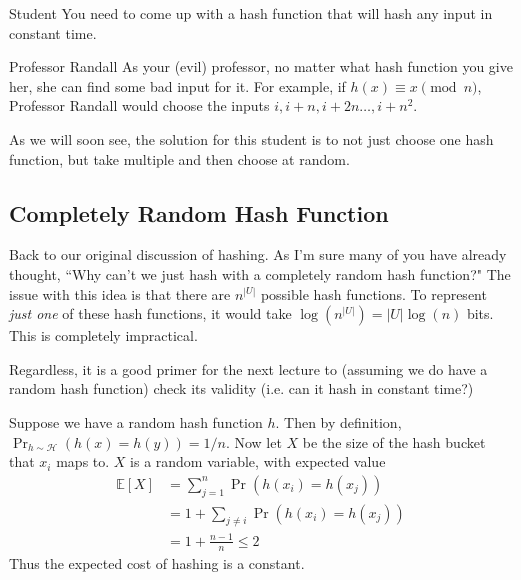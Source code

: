 \documentclass[14pt]{extreport}
\begin{document}
    \begin{tcolorbox}[enhanced,interior style={top color=Plum!10,bottom color=Plum!20}]
        \begin{mybox}[
            colframe=Cerulean!50!black,
            colback=Cerulean!30,
            colbacktitle=Cerulean!,
            coltitle=Cerulean!30!black
            ]{Student}
            You need to come up with a hash function that will hash any input in constant time.
    
        \end{mybox}
        \begin{mybox}[
            colframe=purple!50!black,
            colback=purple!30,
            colbacktitle=purple!50!white,
            coltitle=purple!30!black,
            ]{Professor Randall}
            As your (evil) professor, no matter what hash function you give her, she can find some bad input for it. For example, if $h(x) \equiv x \pmod{n}$,  Professor Randall would choose the inputs $i, i + n, i + 2n \dots, i + n^{2}$.
        \end{mybox}
        As we will soon see, the solution for this student is to not just choose one hash function, but take multiple and then choose at random.
    \end{tcolorbox}

    
\subsection*{Completely Random Hash Function}
    Back to our original discussion of hashing. As I'm sure many of you have already thought, ``Why can't we just hash with a completely random hash function?" The issue with this idea is that there are $n^{|U|}$ possible hash functions. To represent \textit{just one} of these hash functions, it would take $\log\left(n^{|U|}\right) = |U|\log(n)$ bits. This is completely impractical.

    \vspace{3mm}
    Regardless, it is a good primer for the next lecture to (assuming we do have a random hash function) check its validity (i.e. can it hash in constant time?)
    
    \vspace{3mm}
    Suppose we have a random hash function $h$. Then by definition, $\Pr_{h \sim \mathcal{H}}(h(x) = h(y)) = 1/n$. Now let $X$ be the size of the hash bucket that $x_{i}$ maps to. $X$ is a random variable, with expected value
    \begin{align*}
        \mathbb{E}[X] &= \sum_{j = 1}^{n} \Pr(h(x_{i}) = h(x_{j})) \\
        &= 1 + \sum_{j \ne i} \Pr(h(x_{i}) = h(x_{j})) \\
        &= 1 + \frac{n - 1}{n} \le 2
    \end{align*}
    Thus the expected cost of hashing is a constant.
\end{document}
